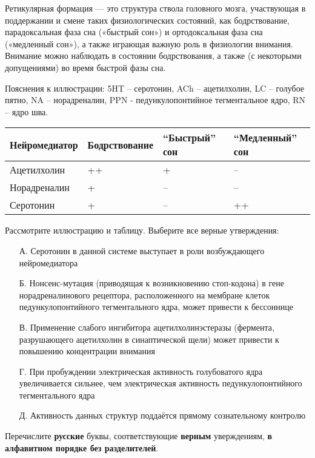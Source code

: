 
Ретикулярная формация — это структура ствола головного мозга, участвующая в поддержании и смене таких физиологических состояний, как бодрствование, парадоксальная фаза сна («быстрый сон») и ортодоксальная фаза сна («медленный сон»), а также играющая важную роль в физиологии внимания. Внимание можно наблюдать в состоянии бодрствования, а также (с некоторыми допущениями) во время быстрой фазы сна. 


Пояснения к иллюстрации: 5HT – серотонин, ACh – ацетилхолин, LC – голубое пятно, NA – норадреналин, PPN - педункулопонтийное тегментальное ядро, RN – ядро шва.

\begin{table}[H]
    \begin{center}
        \begin{tabular}{|p{2cm}|p{2cm}|p{2cm}|p{2cm}|}
            \hline
            Нейромедиатор & Бодрствование & “Быстрый” сон & “Медленный” сон \\
            \hline
            Ацетилхолин & ++ & + & -- \\
            \hline
            Норадреналин & + & -- & -- \\
            \hline
            Серотонин & + & -- & ++ \\
            \hline
        \end{tabular}
    \end{center}
\end{table}

Рассмотрите иллюстрацию и таблицу. Выберите все верные утверждения:
\begin{enumerate}
    \item[А.] Серотонин в данной системе выступает в роли возбуждающего нейромедиатора
    \item[Б.] Нонсенс-мутация (приводящая к возникновению стоп-кодона)  в гене норадреналинового рецептора, расположенного на мембране клеток педункулопонтийного тегментального ядра, может привести к бессоннице
    \item[В.] Применение слабого ингибитора ацетилхолинэстеразы (фермента, разрушающего ацетилхолин в синаптической щели) может привести к повышению концентрации внимания
    \item[Г.] При пробуждении электрическая активность голубоватого ядра увеличивается сильнее, чем электрическая активность педункулопонтийного тегментального ядра
    \item[Д.] Активность данных структур поддаётся прямому сознательному контролю
\end{enumerate} 

Перечислите \textbf{русские} буквы, соответствующие \textbf{верным} уверждениям, \textbf{в алфавитном порядке без разделителей}.

